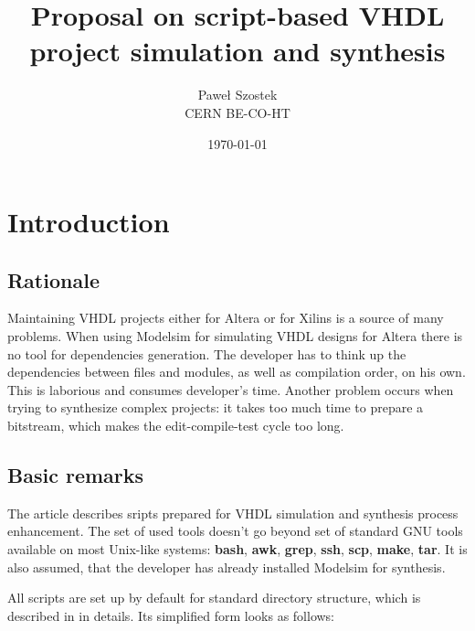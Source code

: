 \documentclass[a4paper,10pt]{article}
\title{Proposal on script-based VHDL project simulation and synthesis}
\author{Paweł Szostek \\ CERN BE-CO-HT}
\date{\today}
\begin{document}
\maketitle
\setcounter{section}{-1}
\section{Introduction}
\subsection{Rationale}
Maintaining VHDL projects either for Altera or for Xilins is a source of many problems. When using Modelsim for simulating VHDL designs for Altera there is no tool for dependencies generation. The developer has to think up the dependencies between files and modules, as well as compilation order, on his own. This is laborious and consumes developer's time. Another problem occurs when trying to synthesize complex projects: it takes too much time to prepare a bitstream, which makes the edit-compile-test cycle too long. 
\subsection{Basic remarks}\label{sec_remarks}
The article describes sripts prepared for VHDL simulation and synthesis process enhancement. The set of used tools doesn't go beyond set of standard GNU tools available on most Unix-like systems: \textbf{bash}, \textbf{awk}, \textbf{grep}, \textbf{ssh}, \textbf{scp}, \textbf{make}, \textbf{tar}. It is also assumed, that the developer has already installed Modelsim for synthesis.

All scripts are set up by default for standard directory structure, which is described in \cite{guidelines} in details.
Its simplified form looks as follows:

\vspace{3mm}
\begin{minipage}{\linewidth}
\small
{}
\normalsize
\end{minipage}
\end{document}
